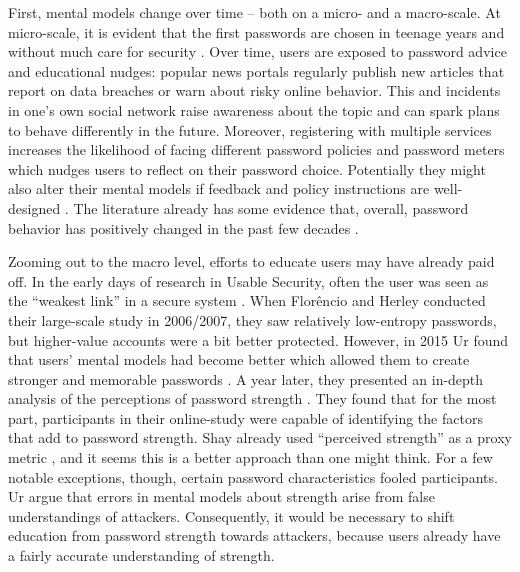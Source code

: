 First, mental models change over time -- both on a micro- and a macro-scale. At micro-scale, it is evident that the first passwords are chosen in teenage years and without much care for security \cite{VonZezschwitz2013SurvivalShortest}. Over time, users are exposed to password advice and educational nudges: popular news portals regularly publish new articles that report on data breaches or warn about risky online behavior. This and incidents in one's own social network \cite{Stobert2014PasswordLifeCycle} raise awareness about the topic and can spark plans to behave differently in the future. Moreover, registering with multiple services increases the likelihood of facing different password policies and password meters which nudges users to reflect on their password choice. Potentially they might also alter their mental models if feedback and policy instructions are well-designed \cite{Shay2015SpoonfulOfSugar, Ur2017DataDrivenPWMeter}. The literature already has some evidence that, overall, password behavior has positively changed in the past few decades \cite{Riley2006WhatUsersKnowWhatTheyDo, Schneier2006RealWorldPasswords}. 

Zooming out to the macro level, efforts to educate users may have already paid off. In the early days of research in Usable Security, often the user was seen as the ``weakest link'' in a secure system \cite{Adams1997MakingPWsSecureAndUsable, Sasse2005UsableSecurityPosition}. When Florêncio and Herley conducted their large-scale study in 2006/2007, they saw relatively low-entropy passwords, but higher-value accounts were a bit better protected. However, in 2015 Ur \etal found that users' mental models had become better which allowed them to create stronger and memorable passwords \cite{Ur2015PWCreationLab}. A year later, they presented an in-depth analysis of the perceptions of password strength \cite{Ur2016PerceptionsPassword}. They found that for the most part, participants in their online-study were capable of identifying the factors that add to password strength. Shay \etal already used ``perceived strength'' as a proxy metric \cite{Shay2015SpoonfulOfSugar}, and it seems this is a better approach than one might think. For a few notable exceptions, though, certain password characteristics fooled participants. Ur \etal argue that errors in mental models about strength arise from false understandings of attackers. Consequently, it would be necessary to shift education from password strength towards attackers, because users already have a fairly accurate understanding of strength. 

